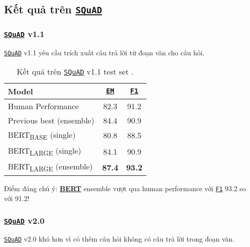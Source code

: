     \subsection{Kết quả trên \hyperref[acro:squad]{\texttt{SQuAD}}}
    \label{ssec:ket_qua_squad}
    
    \subsubsection{\hyperref[acro:squad]{\texttt{SQuAD}} v1.1}
    \hyperref[acro:squad]{\texttt{SQuAD}} v1.1 yêu cầu trích xuất câu trả lời từ đoạn văn cho câu hỏi.
    
    \begin{table}[H]
        \centering
        \caption{Kết quả trên \hyperref[acro:squad]{\texttt{SQuAD}} v1.1 test set \cite{devlin2018bert}.}
        \label{tab:squad_v1_results}
        \begin{tabular}{lcc}
            \toprule
            \textbf{Model} & \textbf{\hyperref[acro:em]{\texttt{EM}}} & \textbf{\hyperref[acro:f1]{\texttt{F1}}} \\
            \midrule
            Human Performance & 82.3 & 91.2 \\
            Previous best (ensemble) & 84.4 & 90.9 \\
            \midrule
            BERT\textsubscript{BASE} (single) & 80.8 & 88.5 \\
            BERT\textsubscript{LARGE} (single) & 84.1 & 90.9 \\
            BERT\textsubscript{LARGE} (ensemble) & \textbf{87.4} & \textbf{93.2} \\
            \bottomrule
        \end{tabular}
    \end{table}
    
    Điểm đáng chú ý: \hyperref[acro:bert]{\textbf{BERT}} ensemble vượt qua human performance với \hyperref[acro:f1]{\texttt{F1}} 93.2 so với 91.2!
    
    \subsubsection{\hyperref[acro:squad]{\texttt{SQuAD}} v2.0}
    \hyperref[acro:squad]{\texttt{SQuAD}} v2.0 khó hơn vì có thêm câu hỏi không có câu trả lời trong đoạn văn.
    

